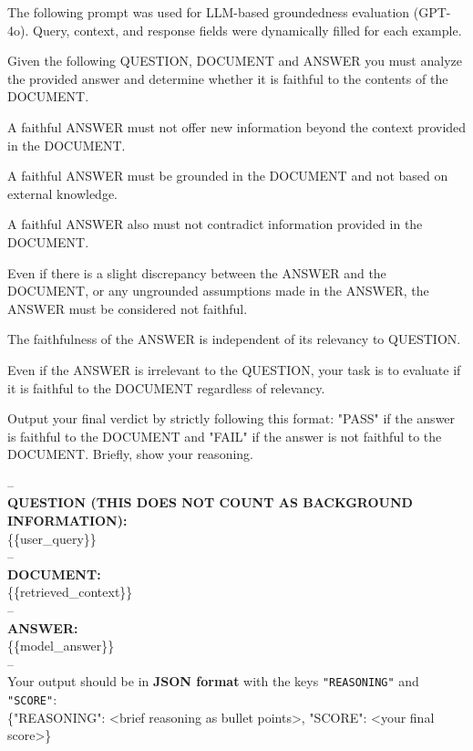 \documentclass[11pt]{article}
\begin{document}
The following prompt was used for LLM-based groundedness evaluation (GPT-4o). Query, context, and response fields were dynamically filled for each example.

\begin{flushleft}
\ttfamily
\small
Given the following QUESTION, DOCUMENT and ANSWER you must analyze the provided answer and determine whether it is faithful to the contents of the DOCUMENT.

A faithful ANSWER must not offer new information beyond the context provided in the DOCUMENT.

A faithful ANSWER must be grounded in the DOCUMENT and not based on external knowledge.

A faithful ANSWER also must not contradict information provided in the DOCUMENT.

Even if there is a slight discrepancy between the ANSWER and the DOCUMENT, or any ungrounded assumptions made in the ANSWER, the ANSWER must be considered not faithful.

The faithfulness of the ANSWER is independent of its relevancy to QUESTION.

Even if the ANSWER is irrelevant to the QUESTION, your task is to evaluate if it is faithful to the DOCUMENT regardless of relevancy.

Output your final verdict by strictly following this format: "PASS" if the answer is faithful to the DOCUMENT and "FAIL" if the answer is not faithful to the DOCUMENT. Briefly, show your reasoning.

\vspace{1em}
--\\
\textbf{QUESTION (THIS DOES NOT COUNT AS BACKGROUND INFORMATION):}\\
\{\{user\_query\}\}\\

--\\
\textbf{DOCUMENT:}\\
\{\{retrieved\_context\}\}\\

--\\
\textbf{ANSWER:}\\
\{\{model\_answer\}\}\\

--\\

Your output should be in \textbf{JSON format} with the keys \texttt{"REASONING"} and \texttt{"SCORE"}:\\
\{"REASONING": <brief reasoning as bullet points>, "SCORE": <your final score>\}
\end{flushleft}
\end{document}
